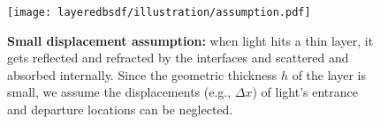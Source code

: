 \begin{figure}[h]
	\centering
	\texttt{[image: layeredbsdf/illustration/assumption.pdf]}
	\caption[Small displacement assumption]{\label{fig:layeredbsdf:assumption}
		\textbf{Small displacement assumption:}
		when light hits a thin layer, it gets reflected and refracted by the interfaces and scattered and absorbed internally.
		Since the geometric thickness $h$ of the layer is small, we assume the displacements (e.g., $\Delta x$) of light's entrance and departure locations can be neglected.
	}
\end{figure}